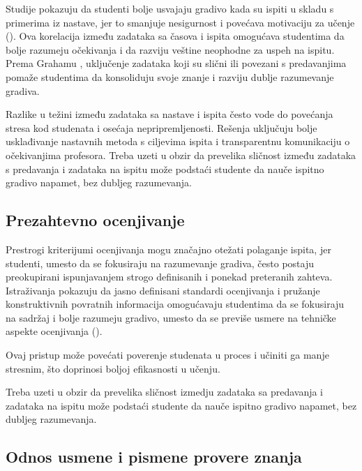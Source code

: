 \documentclass[a4paper]{article}
\begin{document}
Studije pokazuju da studenti bolje usvajaju gradivo kada su ispiti u skladu s primerima iz nastave, jer to smanjuje nesigurnost i povećava motivaciju za učenje (\cite{sambell2013assessment}). Ova korelacija između zadataka sa časova i ispita omogućava studentima da bolje razumeju očekivanja i da razviju veštine neophodne za uspeh na ispitu. Prema Grahamu \cite{graham1999practice}, uključenje zadataka koji su slični ili povezani s predavanjima pomaže studentima da konsoliduju svoje znanje i razviju dublje razumevanje gradiva.

Razlike u težini između zadataka sa nastave i ispita često vode do povećanja stresa kod studenata i osećaja nepripremljenosti. Rešenja uključuju bolje usklađivanje nastavnih metoda s ciljevima ispita i transparentnu komunikaciju o očekivanjima profesora. Treba uzeti u obzir da prevelika sličnost između zadataka s predavanja i zadataka na ispitu može podstaći studente da nauče ispitno gradivo napamet, bez dubljeg razumevanja.

\subsection{Prezahtevno ocenjivanje}

Prestrogi kriterijumi ocenjivanja mogu značajno otežati polaganje ispita, jer studenti, umesto da se fokusiraju na razumevanje gradiva, često postaju preokupirani ispunjavanjem strogo definisanih i ponekad preteranih zahteva. Istraživanja pokazuju da jasno definisani standardi ocenjivanja i pružanje konstruktivnih povratnih informacija omogućavaju studentima da se fokusiraju na sadržaj i bolje razumeju gradivo, umesto da se previše usmere na tehničke aspekte ocenjivanja (\cite{gamage2022rethinking}). 

Ovaj pristup može povećati poverenje studenata u proces i učiniti ga manje stresnim, što doprinosi boljoj efikasnosti u učenju.

Treba uzeti u obzir da prevelika sličnost izmedju zadataka sa predavanja i zadataka na ispitu može podstaći studente da nauče ispitno gradivo napamet, bez
dubljeg razumevanja.

\subsection{Odnos usmene i pismene provere znanja}
\end{document}

